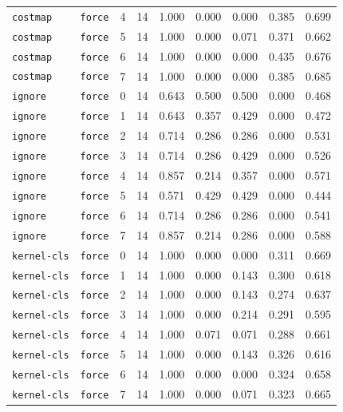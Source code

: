 \documentclass{article}
\begin{document}
\begin{center}
{\begin{tabular}{llllccccc}
\texttt{costmap} & \texttt{force} & 4 & 14 & 1.000 & 0.000 & 0.000 & 0.385 & 0.699 \\
\texttt{costmap} & \texttt{force} & 5 & 14 & 1.000 & 0.000 & 0.071 & 0.371 & 0.662 \\
\texttt{costmap} & \texttt{force} & 6 & 14 & 1.000 & 0.000 & 0.000 & 0.435 & 0.676 \\
\texttt{costmap} & \texttt{force} & 7 & 14 & 1.000 & 0.000 & 0.000 & 0.385 & 0.685 \\
\texttt{ignore} & \texttt{force} & 0 & 14 & 0.643 & 0.500 & 0.500 & 0.000 & 0.468 \\
\texttt{ignore} & \texttt{force} & 1 & 14 & 0.643 & 0.357 & 0.429 & 0.000 & 0.472 \\
\texttt{ignore} & \texttt{force} & 2 & 14 & 0.714 & 0.286 & 0.286 & 0.000 & 0.531 \\
\texttt{ignore} & \texttt{force} & 3 & 14 & 0.714 & 0.286 & 0.429 & 0.000 & 0.526 \\
\texttt{ignore} & \texttt{force} & 4 & 14 & 0.857 & 0.214 & 0.357 & 0.000 & 0.571 \\
\texttt{ignore} & \texttt{force} & 5 & 14 & 0.571 & 0.429 & 0.429 & 0.000 & 0.444 \\
\texttt{ignore} & \texttt{force} & 6 & 14 & 0.714 & 0.286 & 0.286 & 0.000 & 0.541 \\
\texttt{ignore} & \texttt{force} & 7 & 14 & 0.857 & 0.214 & 0.286 & 0.000 & 0.588 \\
\texttt{kernel-cls} & \texttt{force} & 0 & 14 & 1.000 & 0.000 & 0.000 & 0.311 & 0.669 \\
\texttt{kernel-cls} & \texttt{force} & 1 & 14 & 1.000 & 0.000 & 0.143 & 0.300 & 0.618 \\
\texttt{kernel-cls} & \texttt{force} & 2 & 14 & 1.000 & 0.000 & 0.143 & 0.274 & 0.637 \\
\texttt{kernel-cls} & \texttt{force} & 3 & 14 & 1.000 & 0.000 & 0.214 & 0.291 & 0.595 \\
\texttt{kernel-cls} & \texttt{force} & 4 & 14 & 1.000 & 0.071 & 0.071 & 0.288 & 0.661 \\
\texttt{kernel-cls} & \texttt{force} & 5 & 14 & 1.000 & 0.000 & 0.143 & 0.326 & 0.616 \\
\texttt{kernel-cls} & \texttt{force} & 6 & 14 & 1.000 & 0.000 & 0.000 & 0.324 & 0.658 \\
\texttt{kernel-cls} & \texttt{force} & 7 & 14 & 1.000 & 0.000 & 0.071 & 0.323 & 0.665 \\
\bottomrule
\end{tabular}%
}
\end{center}
\end{document}
